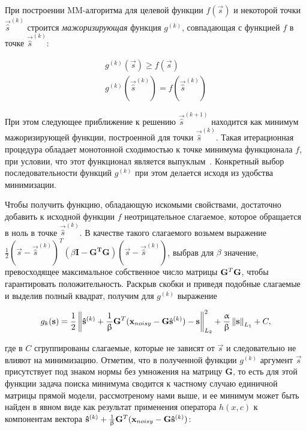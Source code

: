 При построении MM-алгоритма для целевой функции $f(\vec{s})$ и некоторой
точки $\vec{\hat{s}}^{(k)}$ строится \emph{мажоризирующая} функция $g^{(k)}$, совпадающая
с функцией $f$ в точке $\vec{\hat{s}}^{(k)}$:

\begin{gather*}
    g^{(k)}(\vec{s}) \geq f(\vec{s})\\
    g^{(k)}(\vec{\hat{s}}^{(k)}) = f(\vec{\hat{s}}^{(k)})
\end{gather*}

При этом следующее приближение к решению $\vec{\hat{s}}^{(k+1)}$ находится как
минимум мажоризирующей функции, построенной для точки $\vec{\hat{s}}^{(k)}$. Такая
итерационная процедура обладает монотонной сходимостью к точке минимума
функционала $f$, при условии, что этот функционал является выпуклым~\cite{Combettes2005}.
Конкретный выбор последовательности функций $g^{(k)}$ при этом
делается исходя из удобства минимизации.

Чтобы получить функцию, обладающую искомыми свойствами, достаточно добавить к
исходной функции $f$ неотрицательное слагаемое, которое обращается в ноль в
точке $\vec{\hat{s}}^{(k)}$.  В качестве такого слагаемого возьмем выражение
$\frac{1}{2}{(\vec{s} - \vec{\hat{s}}^{(k)})}^T {(\beta\mathbf{I - G^TG})}{(\vec{s} - \vec{\hat{s}}^{(k)})}$,
выбрав для $\beta$ значение, превосходящее максимальное собственное число матрицы
$\mathbf{G}^T\mathbf{G}$, чтобы гарантировать положительность. Раскрыв скобки и приведя подобные
слагаемые и выделив полный квадрат, получим для $g^{(k)}$ выражение

\begin{equation}
    g_k(\mathbf{s}) =
    \frac{1}{2}\left\lVert\mathbf{\hat{s}}^{(k)} + \frac{1}{\upbeta} \mathbf{G}^T(\mathbf{x}_{noisy} - \mathbf{G} \hat{\mathbf{s}}^{(k)}) - \mathbf{s}\right\rVert^2_{L_2} + \frac{\upalpha}{\upbeta}\left\lVert\mathbf{s}\right\rVert_{L_1} + C,
\end{equation}

где в $C$ сгруппированы слагаемые, которые не зависят от $\vec{s}$ и
следовательно не влияют на минимизацию. Отметим, что в полученной функции
$g^{(k)}$ аргумент $\vec{s}$ присутствует под знаком нормы без умножения на
матрицу $\mathbf{G}$, то есть для этой функции задача поиска минимума сводится
к частному случаю единичной матрицы прямой модели, рассмотреному нами выше, и
ее минимум может быть найден в явном виде как результат применения оператора
$h(x, c)$ к компонентам вектора $\mathbf{\hat{s}}^{(k)} + \frac{1}{\upbeta} \mathbf{G}^T(\mathbf{x}_{noisy} - \mathbf{G} \mathbf{\hat{s}}^{(k)})$:

